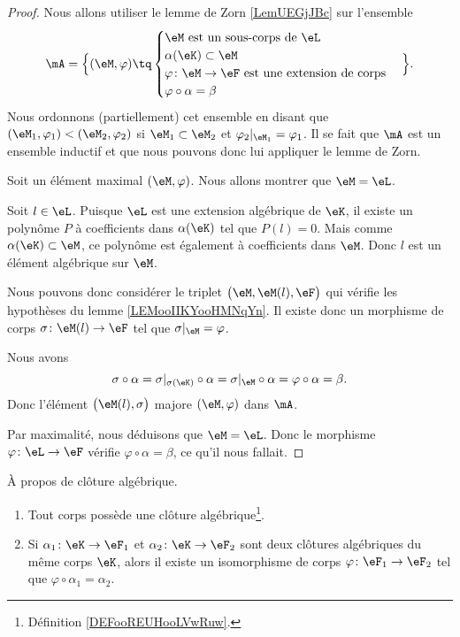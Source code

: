 \begin{proof}
	Nous allons utiliser le lemme de Zorn \ref{LemUEGjJBc} sur l'ensemble
	\begin{equation}
		\mA=\Big\{  (\eM,\varphi)  \tq
		\begin{cases}
			\eM\text{ est un sous-corps de } \eL                       \\
			\alpha(\eK)\subset \eM                                     \\
			\varphi\colon \eM\to \eF\text{ est une extension de corps} \\
			\varphi\circ \alpha=\beta
		\end{cases}
		\Big\}.
	\end{equation}
	Nous ordonnons (partiellement) cet ensemble en disant que \( (\eM_1,\varphi_1)<(\eM_2,\varphi_2)\) si \( \eM_1\subset \eM_2\) et \( \varphi_2|_{\eM_1}=\varphi_1\). Il se fait que \( \mA\) est un ensemble inductif et que nous pouvons donc lui appliquer le lemme de Zorn.

	Soit un élément maximal \( (\eM,\varphi)\). Nous allons montrer que \( \eM=\eL\).

	Soit \( l\in \eL\). Puisque \( \eL\) est une extension algébrique de \( \eK\), il existe un polynôme \( P\) à coefficients dans \( \alpha(\eK)\) tel que \( P(l)=0\). Mais comme \( \alpha(\eK)\subset \eM\), ce polynôme est également à coefficients dans \( \eM\). Donc \( l\) est un élément algébrique sur \( \eM\).

	Nous pouvons donc considérer le triplet \( \big( \eM,\eM(l),\eF \big)\) qui vérifie les hypothèses du lemme \ref{LEMooIIKYooHMNqYn}. Il existe donc un morphisme de corps \( \sigma\colon \eM(l)\to \eF\) tel que \( \sigma|_{\eM}=\varphi\).

	Nous avons
	\begin{equation}
		\sigma\circ\alpha=\sigma|_{\sigma(\eK)}\circ \alpha=\sigma|_{\eM}\circ \alpha=\varphi\circ \alpha=\beta.
	\end{equation}
	Donc l'élément \( \big( \eM(l),\sigma \big)\) majore \( (\eM,\varphi)\) dans \( \mA\).

	Par maximalité, nous déduisons que \( \eM=\eL\). Donc le morphisme \( \varphi\colon \eL\to \eF\) vérifie \( \varphi\circ \alpha=\beta\), ce qu'il nous fallait.
\end{proof}

\begin{theorem}       \label{THOooEDQKooLEGlDv}
	À propos de clôture algébrique.
	\begin{enumerate}
		\item
		      Tout corps possède une clôture algébrique\footnote{Définition \ref{DEFooREUHooLVwRuw}.}.
		\item
		      Si \( \alpha_1\colon \eK\to \eF_1\) et \( \alpha_2\colon \eK\to \eF_2\) sont deux clôtures algébriques du même corps \( \eK\), alors il existe un isomorphisme de corps \( \varphi\colon \eF_1\to \eF_2\) tel que \( \varphi\circ\alpha_1=\alpha_2\).
	\end{enumerate}
\end{theorem}

